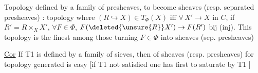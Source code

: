 Topology defined by a family \inserted{$\Phi$} of presheaves, to become sheaves (resp. separated presheaves) : topology  where $(R\hookrightarrow X)\in T_\Phi(X)$ iff $\forall\,X'\to X$ in $C$, if $R'=R\times_X X'$, $\forall F\in\Phi$, $F(\deleted{\unsure{R}}X')\to F(R')$ bij (inj). This topology is the finest  among those turning  $F\in\Phi$ into sheaves (sep. presheaves)

\uline{Cor} If T1 is defined by a family of sieves, then  of sheaves (resp. presheaves) for topology generated is easy [if T1 not satisfied one has first to saturate by T1 ]
